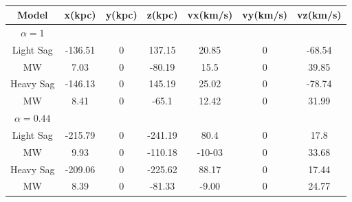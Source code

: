 \begin{table}
\begin{tabular}{c c c c c c c}
\hline
Model & x(kpc) & y(kpc) & z(kpc) & vx(km/s) & vy(km/s) & vz(km/s) \\
\hline
${\alpha=1}$ & & & & & & \\
Light Sag &  -136.51 & 0 & 137.15 & 20.85 &  0 & -68.54  \\ 
MW & 7.03 & 0 & -80.19 & 15.5 & 0 & 39.85 \\
\hline
Heavy Sag & -146.13 & 0 & 145.19 & 25.02 & 0 & -78.74 \\
MW & 8.41 & 0 & -65.1& 12.42& 0 & 31.99\\
\hline
${\alpha=0.44}$ & & & & & & \\
Light Sag & -215.79  & 0 & -241.19 & 80.4 & 0 & 17.8 \\ 
MW & 9.93 & 0 & -110.18 & -10-03 & 0  & 33.68 \\
\hline
Heavy Sag & -209.06 & 0  & -225.62 & 88.17 & 0 & 17.44 \\
MW & 8.39 & 0 & -81.33 & -9.00 & 0 & 24.77\\
\hline
\end{tabular}
\caption{}
\end{table}
